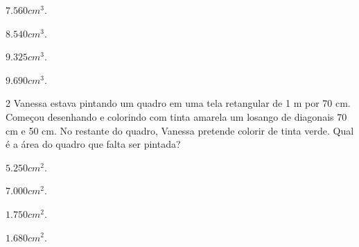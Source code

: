\begin{escolha}[itemsep=0pt]
\item $7.560 cm^3$.
\item $8.540 cm^3$.
\item $9.325 cm^3$.
\item $9.690 cm^3$.
\end{escolha}











\num{2} Vanessa estava pintando um quadro em uma tela retangular de 1 m por
70 cm. Começou desenhando e colorindo com tinta amarela um losango de
diagonais 70 cm e 50 cm. No restante do quadro, Vanessa pretende colorir
de tinta verde. Qual é a área do quadro que falta ser pintada?


\begin{escolha}[itemsep=0pt]
\item $5.250 cm^2$.
\item $7.000 cm^2$.
\item $1.750 cm^2$.
\item $1.680 cm^2$.
\end{escolha}


